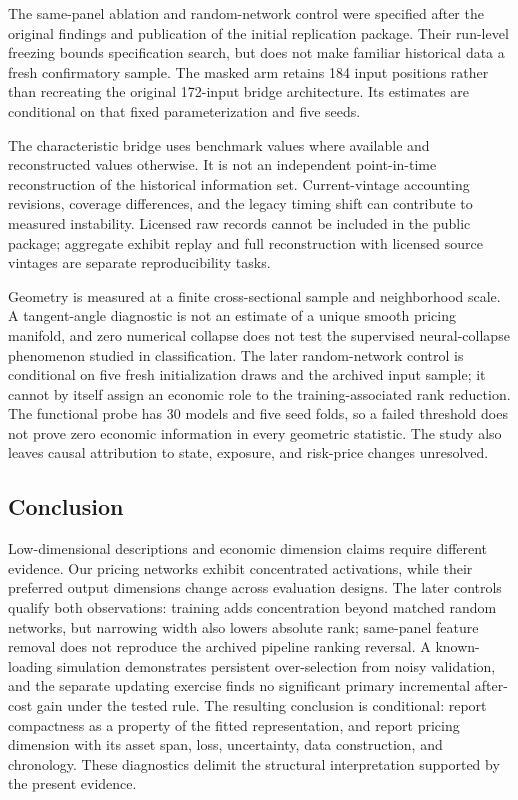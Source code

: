 The same-panel ablation and random-network control were specified after the original findings and publication of the initial replication package. Their run-level freezing bounds specification search, but does not make familiar historical data a fresh confirmatory sample. The masked arm retains 184 input positions rather than recreating the original 172-input bridge architecture. Its estimates are conditional on that fixed parameterization and five seeds.

The characteristic bridge uses benchmark values where available and reconstructed values otherwise. It is not an independent point-in-time reconstruction of the historical information set. Current-vintage accounting revisions, coverage differences, and the legacy timing shift can contribute to measured instability. Licensed raw records cannot be included in the public package; aggregate exhibit replay and full reconstruction with licensed source vintages are separate reproducibility tasks.

Geometry is measured at a finite cross-sectional sample and neighborhood scale. A tangent-angle diagnostic is not an estimate of a unique smooth pricing manifold, and zero numerical collapse does not test the supervised neural-collapse phenomenon studied in classification. The later random-network control is conditional on five fresh initialization draws and the archived input sample; it cannot by itself assign an economic role to the training-associated rank reduction. The functional probe has 30 models and five seed folds, so a failed threshold does not prove zero economic information in every geometric statistic. The study also leaves causal attribution to state, exposure, and risk-price changes unresolved.

\subsection{Conclusion}

Low-dimensional descriptions and economic dimension claims require different evidence. Our pricing networks exhibit concentrated activations, while their preferred output dimensions change across evaluation designs. The later controls qualify both observations: training adds concentration beyond matched random networks, but narrowing width also lowers absolute rank; same-panel feature removal does not reproduce the archived pipeline ranking reversal. A known-loading simulation demonstrates persistent over-selection from noisy validation, and the separate updating exercise finds no significant primary incremental after-cost gain under the tested rule. The resulting conclusion is conditional: report compactness as a property of the fitted representation, and report pricing dimension with its asset span, loss, uncertainty, data construction, and chronology. These diagnostics delimit the structural interpretation supported by the present evidence.

